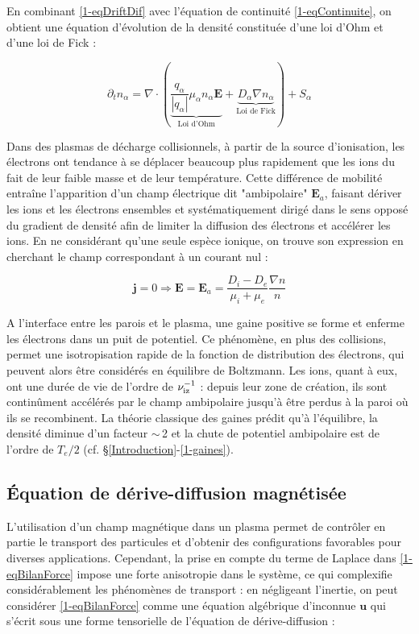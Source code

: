 \begin{refsection}
En combinant \eqref{1-eqDriftDif} avec l'équation de continuité
\eqref{1-eqContinuite}, on obtient une équation d'évolution de la densité
constituée d'une loi d'Ohm et d'une loi de Fick :
 
\begin{equation}
\label{1-eqDriftDifContinuite}
\partial_t
n_\alpha=\nabla\cdot(\underbrace{\frac{q_\alpha}{|q_\alpha|}\mu_\alpha n_\alpha\mathbf E}_\text{Loi d'Ohm}+\underbrace{D_\alpha{\nabla n_\alpha}}_\text{Loi
de Fick})+S_\alpha
\end{equation}

Dans des plasmas de décharge collisionnels, à partir de la source d'ionisation,
les électrons ont tendance à se déplacer beaucoup plus rapidement que les ions
du fait de leur faible masse et de leur température. Cette différence de
mobilité entraîne l'apparition d'un champ électrique dit "ambipolaire"
$\mathbf E_a$, faisant dériver les ions et les électrons ensembles et
systématiquement dirigé dans le sens opposé du gradient de densité afin de
limiter la diffusion des électrons et accélérer les ions. En ne considérant
qu'une seule espèce ionique, on trouve son expression en cherchant le champ
correspondant à un courant nul :
 
\begin{equation}
\label{1-eqEAmb}
\mathbf j=0 \Rightarrow \mathbf E=\mathbf
E_a=\frac{D_i-D_e}{\mu_i+\mu_e}\frac{\nabla n}{n}
\end{equation}

A l'interface entre les parois et le plasma, une gaine positive se
forme et enferme les électrons dans un puit de potentiel. Ce phénomène, en plus
des collisions, permet une isotropisation rapide de la fonction de distribution
des électrons, qui peuvent alors être considérés en équilibre de Boltzmann.
Les ions, quant à eux, ont une durée de vie de l'ordre de
$\nu_\text{iz}^{{-1}}$ : depuis leur zone de création, ils sont
continûment accélérés par le champ ambipolaire jusqu'à être perdus à la paroi
où ils se recombinent. La théorie classique des gaines prédit qu'à l'équilibre,
la densité diminue d'un facteur $\sim\,$2 et la chute de potentiel ambipolaire
est de l'ordre de $T_e/2$ (cf. \S\ref{Introduction}-\ref{1-gaines}).

\subsection{Équation de dérive-diffusion magnétisée}
\label{1-deriveDiffMag}
L'utilisation d'un champ magnétique dans un plasma permet de contrôler en partie
le transport des particules et d'obtenir des configurations favorables pour
diverses applications. Cependant, la prise en compte du terme de Laplace dans
\eqref{1-eqBilanForce} impose une forte anisotropie dans le système, ce qui
complexifie considérablement les phénomènes de transport : en
négligeant l'inertie, on peut considérer \eqref{1-eqBilanForce} comme une
équation algébrique d'inconnue $\mathbf u$ qui s'écrit sous une forme
tensorielle de l'équation de dérive-diffusion :


\end{refsection}
